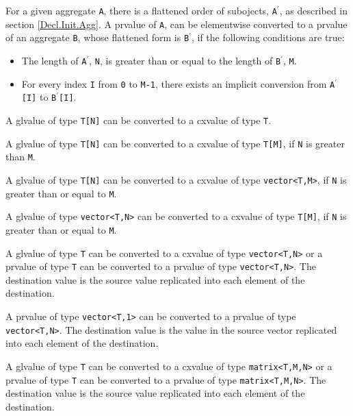 
\p For a given aggregate \texttt{A}, there is a flattened order of subojects,
\texttt{A$^\prime$}, as described in section \ref{Decl.Init.Agg}.  A prvalue of
\texttt{A}, can be elementwise converted to a prvalue of an aggregate
\texttt{B}, whose flattened form is \texttt{B$^\prime$}, if the following
conditions are true:
\begin{itemize}
\item The length of \texttt{A$^\prime$}, \texttt{N}, is greater than or equal to
the length of \texttt{B$^\prime$}, \texttt{M}.
\item For every index \texttt{I} from \texttt{0} to \texttt{M-1}, there exists
an implicit conversion from \texttt{A$^\prime$[I]} to \texttt{B$^\prime$[I]}.
\end{itemize}

\p A glvalue of type \texttt{T[N]} can be converted to a cxvalue of type
\texttt{T}.

\p A glvalue of type \texttt{T[N]} can be converted to a cxvalue of type
\texttt{T[M]}, if \texttt{N} is greater than \texttt{M}.

\p A glvalue of type \texttt{T[N]} can be converted to a cxvalue of type
\texttt{vector<T,M>}, if \texttt{N} is greater than or equal to \texttt{M}.

\p A glvalue of type \texttt{vector<T,N>} can be converted to a cxvalue of type
\texttt{T[M]}, if \texttt{N} is greater than or equal to \texttt{M}.


\p A glvalue of type \texttt{T} can be converted to a cxvalue of type
\texttt{vector<T,N>} or a prvalue of type \texttt{T} can be converted to a
prvalue of type \texttt{vector<T,N>}. The destination value is the source value
replicated into each element of the destination.

\p A prvalue of type \texttt{vector<T,1>} can be converted to a prvalue of type
\texttt{vector<T,N>}. The destination value is the value in the source vector
replicated into each element of the destination.


\p A glvalue of type \texttt{T} can be converted to a cxvalue of type
\texttt{matrix<T,M,N>} or a prvalue of type \texttt{T} can be converted to a
prvalue of type \texttt{matrix<T,M,N>}. The destination value is the source
value replicated into each element of the destination.


